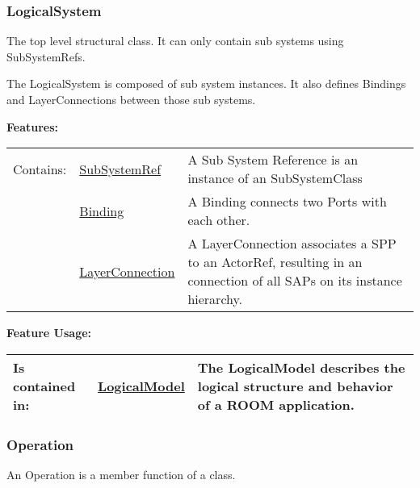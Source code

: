 	
	\vspace{\baselineskip}
	\vspace{\baselineskip}
	\vspace{\baselineskip}
	
\subsubsection{LogicalSystem}
	\hypertarget{ref:LogicalSystem}{}
	The top level structural class. It can only contain sub systems using SubSystemRefs.
		
	The LogicalSystem is composed of sub system instances. It also defines Bindings and LayerConnections between those sub systems. 
		
		
	\begingroup
	\textbf{Features:}
	\renewcommand{\arraystretch}{1.8} %
	\begin{longtable}{l|l p{}}
		\hline
	Contains: & \tabitem \hyperlink{ref:SubSystemRef}{SubSystemRef}  & A Sub System Reference is an instance of an SubSystemClass\\
	& \tabitem \hyperlink{ref:Binding}{Binding}  & A Binding connects two Ports with each other. \\
	& \tabitem \hyperlink{ref:LayerConnection}{LayerConnection}  & A LayerConnection associates a SPP to an ActorRef, resulting in an connection of all SAPs on its instance hierarchy. \\
	\hline
	\end{longtable}
	\endgroup
		
	\begingroup
	\textbf{Feature Usage:}
	\renewcommand{\arraystretch}{1.8} %
	\begin{longtable}{l|l p{}}
		\hline
	Is contained in: & \tabitem \hyperlink{ref:LogicalModel}{LogicalModel}  & The LogicalModel describes the logical structure and behavior of a ROOM application.\\
	\hline
	\end{longtable}
	\endgroup
		
	
	\vspace{\baselineskip}
	\vspace{\baselineskip}
	\vspace{\baselineskip}
	
\subsubsection{Operation}
	\hypertarget{ref:Operation}{}
	An Operation is a member function of a class.
		
